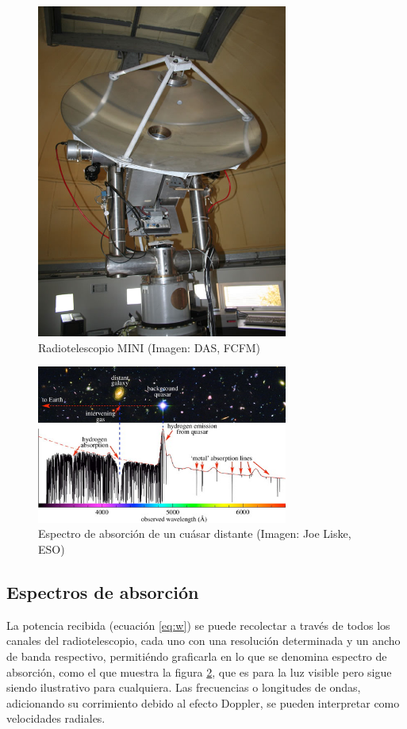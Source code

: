 \begin{figure}[p]
	\centering
	\includegraphics[width=3.25in]{rsc/mini.jpg}
	\caption{Radiotelescopio MINI (Imagen: DAS, FCFM)}
	\label{fig:mini}
\end{figure}

\begin{figure}[p]
	\centering
	\includegraphics[width=3.25in]{rsc/spectrum.jpg}
	\caption{Espectro de absorción de un cuásar distante (Imagen: Joe Liske, ESO)}
	\label{fig:spectrum}
\end{figure}

\subsection{Espectros de absorción}

La potencia recibida (ecuación \ref{eq:w}) se puede recolectar a través de todos los canales del radiotelescopio, cada uno con una resolución determinada y un ancho de banda respectivo, permitiéndo graficarla en lo que se denomina espectro de absorción, como el que muestra la figura \ref{fig:spectrum}, que es para la luz visible pero sigue siendo ilustrativo para cualquiera. Las frecuencias o longitudes de ondas, adicionando su corrimiento debido al efecto Doppler, se pueden interpretar como velocidades radiales.

